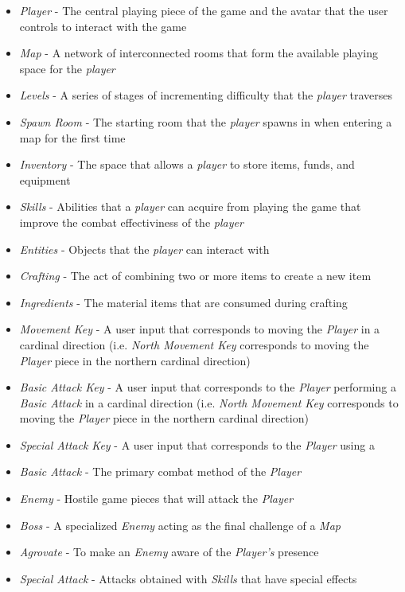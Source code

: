\documentclass[12pt, titlepage]{article}
\begin{document}
  \begin{itemize}
    \item[] \textit{Player} - The central playing piece of the game and the avatar that the user controls to interact with the game
    \item[] \textit{Map} - A network of interconnected rooms that form the available playing space for the \textit{player}
    \item[] \textit{Levels} - A series of stages of incrementing difficulty that the \textit{player} traverses
    \item[] \textit{Spawn Room} - The starting room that the \textit{player} spawns in when entering a map for the first time
    \item[] \textit{Inventory} - The space that allows a \textit{player} to store items, funds, and equipment
    \item[] \textit{Skills} - Abilities that a \textit{player} can acquire from playing the game that improve the combat effectiviness of the \textit{player}
    \item[] \textit{Entities} - Objects that the \textit{player} can interact with
    \item[] \textit{Crafting} - The act of combining two or more items to create a new item
    \item[] \textit{Ingredients} - The material items that are consumed during crafting
    \item[] \textit{Movement Key} - A user input that corresponds to moving the \textit{Player} in a cardinal direction (i.e. \textit{North Movement Key} corresponds to moving the \textit{Player} piece in the northern cardinal direction)
    \item[] \textit{Basic Attack Key} - A user input that corresponds to the \textit{Player} performing a \textit{Basic Attack} in a cardinal direction (i.e. \textit{North Movement Key} corresponds to moving the \textit{Player} piece in the northern cardinal direction)
    \item[] \textit{Special Attack Key} - A user input that corresponds to the \textit{Player} using a \
    \item[] \textit{Basic Attack} - The primary combat method of the \textit{Player}
    \item[] \textit{Enemy} - Hostile game pieces that will attack the \textit{Player}
    \item[] \textit{Boss} - A specialized \textit{Enemy} acting as the final challenge of a \textit{Map}
    \item[] \textit{Agrovate} - To make an \textit{Enemy} aware of the \textit{Player's} presence
    \item[] \textit{Special Attack} - Attacks obtained with \textit{Skills} that have special effects
  \end{itemize}
\end{document}

